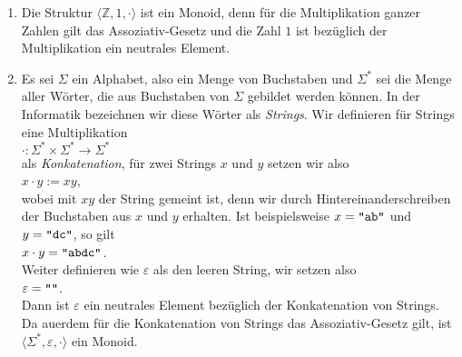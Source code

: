 \examples
\begin{enumerate}
\item Die Struktur $\langle \mathbb{Z}, 1, \cdot \rangle$ ist ein Monoid, denn f\"{u}r die Multiplikation
      ganzer Zahlen gilt das Assoziativ-Gesetz und die Zahl $1$ ist bez\"{u}glich der Multiplikation ein
      neutrales Element.
\item Es sei $\Sigma$ ein Alphabet, also ein Menge von Buchstaben und $\Sigma^*$ sei die Menge aller
      W\"{o}rter, die aus Buchstaben von $\Sigma$ gebildet werden k\"{o}nnen.  In der Informatik bezeichnen
      wir diese W\"{o}rter als \emph{Strings}.  Wir definieren f\"{u}r Strings eine Multiplikation
      \\[0.2cm]
      \hspace*{1.3cm}
      $\cdot: \Sigma^* \times \Sigma^* \rightarrow \Sigma^*$
      \\[0.2cm]
      als \emph{Konkatenation}, f\"{u}r zwei Strings $x$ und $y$ setzen wir also
      \\[0.2cm]
      \hspace*{1.3cm}
      $x \cdot y := xy$,
      \\[0.2cm]
      wobei mit $xy$ der String gemeint ist, denn wir durch Hintereinanderschreiben der Buchstaben
      aus $x$ und $y$ erhalten.  Ist beispielsweise $x = \texttt{\symbol{34}ab\symbol{34}}$ und $y = \texttt{\symbol{34}dc\symbol{34}}$,
      so gilt 
      \\[0.2cm]
      \hspace*{1.3cm}
      $x \cdot y = \texttt{\symbol{34}abdc\symbol{34}}$.
      \\[0.2cm]
      Weiter definieren wie $\varepsilon$ als den leeren String, wir setzen also
      \\[0.2cm]
      \hspace*{1.3cm}
      $\varepsilon = \texttt{\symbol{34}\symbol{34}}$.
      \\[0.2cm]
      Dann ist $\varepsilon$ ein neutrales Element bez\"{u}glich der Konkatenation von Strings.  Da
      au\3erdem f\"{u}r die Konkatenation von Strings das Assoziativ-Gesetz gilt, ist $\langle \Sigma^*, \varepsilon, \cdot \rangle$ ein
      Monoid. 
      \eox
\end{enumerate}


